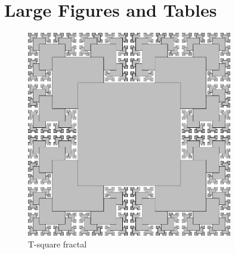 \chapter{Large Figures and Tables}
\label{sec:Appendix1}
\begin{figure}[!h]
	\centering
	\includegraphics[width=0.8\textwidth]{Figures/FigC.pdf}
	\caption{T-square fractal}
	\label{fig:TSquareFractal}
\end{figure}


